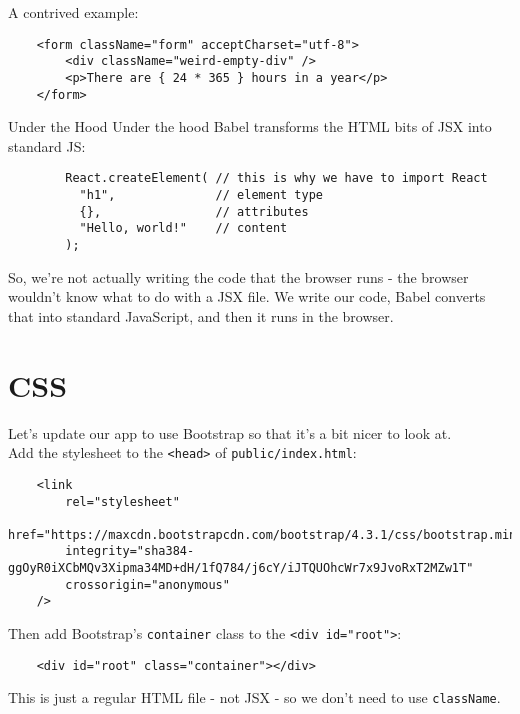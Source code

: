 A contrived example:

\begin{verbatim}
    <form className="form" acceptCharset="utf-8">
        <div className="weird-empty-div" />
        <p>There are { 24 * 365 } hours in a year</p>
    </form>
\end{verbatim}


\begin{infobox}{Under the Hood}
    Under the hood Babel transforms the HTML bits of JSX into standard JS:

    \begin{verbatim}
        React.createElement( // this is why we have to import React
          "h1",              // element type
          {},                // attributes
          "Hello, world!"    // content
        );
    \end{verbatim}

    So, we're not actually writing the code that the browser runs - the browser wouldn't know what to do with a JSX file. We write our code, Babel converts that into standard JavaScript, and then it runs in the browser.
\end{infobox}



\section{CSS}

Let's update our app to use Bootstrap so that it's a bit nicer to look at.
\\

Add the stylesheet to the \texttt{<head>} of \texttt{public/index.html}:

\begin{verbatim}
    <link
        rel="stylesheet"
        href="https://maxcdn.bootstrapcdn.com/bootstrap/4.3.1/css/bootstrap.min.css"
        integrity="sha384-ggOyR0iXCbMQv3Xipma34MD+dH/1fQ784/j6cY/iJTQUOhcWr7x9JvoRxT2MZw1T"
        crossorigin="anonymous"
    />
\end{verbatim}

Then add Bootstrap's \texttt{container} class to the \texttt{<div id="root">}:

\begin{verbatim}
    <div id="root" class="container"></div>
\end{verbatim}

This is just a regular HTML file - not JSX - so we don't need to use \texttt{className}.


